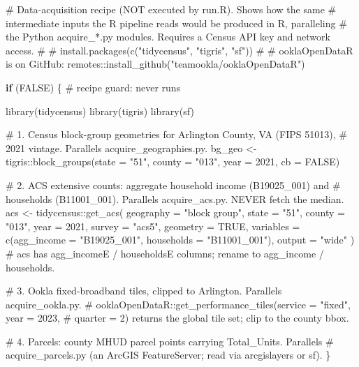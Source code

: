 \documentclass[
  letterpaper,
  DIV=11,
  numbers=noendperiod]{scrreprt}
\newenvironment{Shaded}{\begin{snugshade}}{\end{snugshade}}
\newcommand{\AttributeTok}[1]{\textcolor[rgb]{0.40,0.45,0.13}{#1}}
\newcommand{\CommentTok}[1]{\textcolor[rgb]{0.37,0.37,0.37}{#1}}
\newcommand{\ConstantTok}[1]{\textcolor[rgb]{0.56,0.35,0.01}{#1}}
\newcommand{\ControlFlowTok}[1]{\textcolor[rgb]{0.00,0.23,0.31}{\textbf{#1}}}
\newcommand{\DecValTok}[1]{\textcolor[rgb]{0.68,0.00,0.00}{#1}}
\newcommand{\FunctionTok}[1]{\textcolor[rgb]{0.28,0.35,0.67}{#1}}
\newcommand{\NormalTok}[1]{\textcolor[rgb]{0.00,0.23,0.31}{#1}}
\newcommand{\OtherTok}[1]{\textcolor[rgb]{0.00,0.23,0.31}{#1}}
\newcommand{\SpecialCharTok}[1]{\textcolor[rgb]{0.37,0.37,0.37}{#1}}
\newcommand{\StringTok}[1]{\textcolor[rgb]{0.13,0.47,0.30}{#1}}
\begin{document}
\begin{Shaded}
\begin{Highlighting}[]
\CommentTok{\# Data{-}acquisition recipe (NOT executed by run.R). Shows how the same}
\CommentTok{\# intermediate inputs the R pipeline reads would be produced in R, paralleling}
\CommentTok{\# the Python acquire\_*.py modules. Requires a Census API key and network access.}
\CommentTok{\#}
\CommentTok{\# install.packages(c("tidycensus", "tigris", "sf"))}
\CommentTok{\# \# ooklaOpenDataR is on GitHub: remotes::install\_github("teamookla/ooklaOpenDataR")}

\ControlFlowTok{if}\NormalTok{ (}\ConstantTok{FALSE}\NormalTok{) \{  }\CommentTok{\# recipe guard: never runs}

  \FunctionTok{library}\NormalTok{(tidycensus)}
  \FunctionTok{library}\NormalTok{(tigris)}
  \FunctionTok{library}\NormalTok{(sf)}

  \CommentTok{\# 1. Census block{-}group geometries for Arlington County, VA (FIPS 51013),}
  \CommentTok{\#    2021 vintage. Parallels acquire\_geographies.py.}
\NormalTok{  bg\_geo }\OtherTok{\textless{}{-}}\NormalTok{ tigris}\SpecialCharTok{::}\FunctionTok{block\_groups}\NormalTok{(}\AttributeTok{state =} \StringTok{"51"}\NormalTok{, }\AttributeTok{county =} \StringTok{"013"}\NormalTok{, }\AttributeTok{year =} \DecValTok{2021}\NormalTok{, }\AttributeTok{cb =} \ConstantTok{FALSE}\NormalTok{)}

  \CommentTok{\# 2. ACS extensive counts: aggregate household income (B19025\_001) and}
  \CommentTok{\#    households (B11001\_001). Parallels acquire\_acs.py. NEVER fetch the median.}
\NormalTok{  acs }\OtherTok{\textless{}{-}}\NormalTok{ tidycensus}\SpecialCharTok{::}\FunctionTok{get\_acs}\NormalTok{(}
    \AttributeTok{geography =} \StringTok{"block group"}\NormalTok{, }\AttributeTok{state =} \StringTok{"51"}\NormalTok{, }\AttributeTok{county =} \StringTok{"013"}\NormalTok{,}
    \AttributeTok{year =} \DecValTok{2021}\NormalTok{, }\AttributeTok{survey =} \StringTok{"acs5"}\NormalTok{, }\AttributeTok{geometry =} \ConstantTok{TRUE}\NormalTok{,}
    \AttributeTok{variables =} \FunctionTok{c}\NormalTok{(}\AttributeTok{agg\_income =} \StringTok{"B19025\_001"}\NormalTok{, }\AttributeTok{households =} \StringTok{"B11001\_001"}\NormalTok{),}
    \AttributeTok{output =} \StringTok{"wide"}
\NormalTok{  )}
  \CommentTok{\# acs has agg\_incomeE / householdsE columns; rename to agg\_income / households.}

  \CommentTok{\# 3. Ookla fixed{-}broadband tiles, clipped to Arlington. Parallels acquire\_ookla.py.}
  \CommentTok{\#    ooklaOpenDataR::get\_performance\_tiles(service = "fixed", year = 2023,}
  \CommentTok{\#      quarter = 2) returns the global tile set; clip to the county bbox.}

  \CommentTok{\# 4. Parcels: county MHUD parcel points carrying Total\_Units. Parallels}
  \CommentTok{\#    acquire\_parcels.py (an ArcGIS FeatureServer; read via arcgislayers or sf).}
\NormalTok{\}}
\end{Highlighting}
\end{Shaded}
\end{document}

